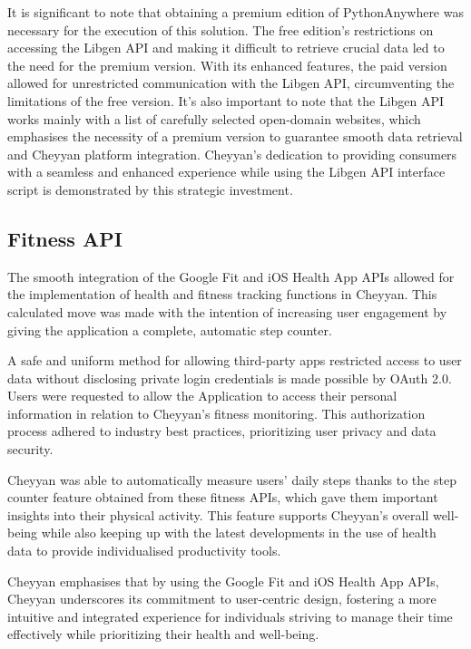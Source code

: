 \documentclass{l4proj}
\begin{document}
It is significant to note that obtaining a premium edition of PythonAnywhere was necessary for the execution of this solution. The free edition's restrictions on accessing the Libgen API and making it difficult to retrieve crucial data led to the need for the premium version. With its enhanced features, the paid version allowed for unrestricted communication with the Libgen API, circumventing the limitations of the free version. It's also important to note that the Libgen API works mainly with a list of carefully selected open-domain websites, which emphasises the necessity of a premium version to guarantee smooth data retrieval and Cheyyan platform integration. Cheyyan's dedication to providing consumers with a seamless and enhanced experience while using the Libgen API interface script is demonstrated by this strategic investment.

\subsection{Fitness API}
The smooth integration of the Google Fit and iOS Health App APIs allowed for the implementation of health and fitness tracking functions in Cheyyan. This calculated move was made with the intention of increasing user engagement by giving the application a complete, automatic step counter.

A safe and uniform method for allowing third-party apps restricted access to user data without disclosing private login credentials is made possible by OAuth 2.0. Users were requested to allow the Application to access their personal information in relation to Cheyyan's fitness monitoring. This authorization process adhered to industry best practices, prioritizing user privacy and data security.

Cheyyan was able to automatically measure users' daily steps thanks to the step counter feature obtained from these fitness APIs, which gave them important insights into their physical activity. This feature supports Cheyyan's overall well-being while also keeping up with the latest developments in the use of health data to provide individualised productivity tools.


Cheyyan emphasises that by using the Google Fit and iOS Health App APIs, Cheyyan underscores its commitment to user-centric design, fostering a more intuitive and integrated experience for individuals striving to manage their time effectively while prioritizing their health and well-being.

\end{document}
